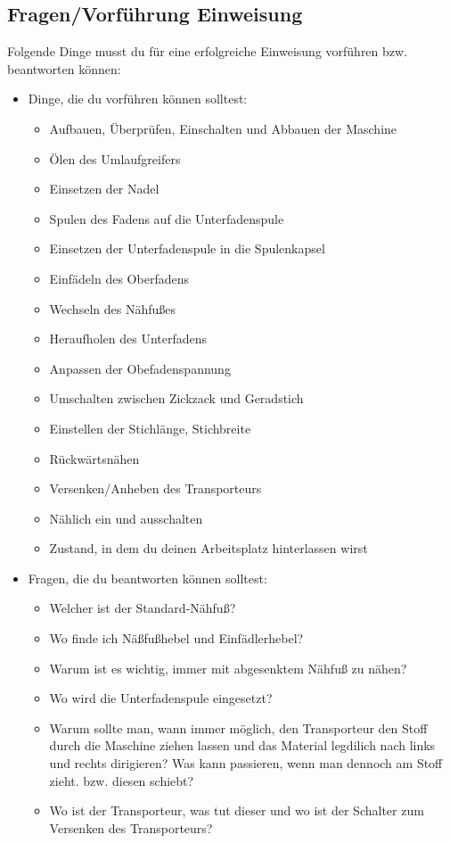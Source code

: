 \documentclass{\basedir/fablab-document}
\begin{document}
\pagebreak

\subsection{Fragen/Vorführung Einweisung}
Folgende Dinge musst du für eine erfolgreiche Einweisung vorführen bzw. beantworten können:
\begin{itemize}
	\item Dinge, die du vorführen können solltest:
	\begin{itemize}
		\item Aufbauen, Überprüfen, Einschalten und Abbauen der Maschine
		\item Ölen des Umlaufgreifers
		\item Einsetzen der Nadel
		\item Spulen des Fadens auf die Unterfadenspule
		\item Einsetzen der Unterfadenspule in die Spulenkapsel
		\item Einfädeln des Oberfadens
		\item Wechseln des Nähfußes
		\item Heraufholen des Unterfadens
		\item Anpassen der Obefadenspannung
		\item Umschalten zwischen Zickzack und Geradstich
		\item Einstellen der Stichlänge, Stichbreite
		\item Rückwärtsnähen
		\item Versenken/Anheben des Transporteurs
		\item Nählich ein und ausschalten
		\item Zustand, in dem du deinen Arbeitsplatz hinterlassen wirst
	\end{itemize}
	
	\item Fragen, die du beantworten können solltest:
	\begin{itemize}
		\item Welcher ist der Standard-Nähfuß?
		\item Wo finde ich Näßfußhebel und Einfädlerhebel?
		\item Warum ist es wichtig, immer mit abgesenktem Nähfuß zu nähen?
		\item Wo wird die Unterfadenspule eingesetzt?
		\item Warum sollte man, wann immer möglich, den Transporteur den Stoff durch die Maschine ziehen lassen und das Material legdilich nach links und rechts dirigieren? Was kann passieren, wenn man dennoch am Stoff zieht. bzw. diesen schiebt?
		\item Wo ist der Transporteur, was tut dieser und wo ist der Schalter zum Versenken des Transporteurs?
	\end{itemize}
\end{itemize}
\end{document}
